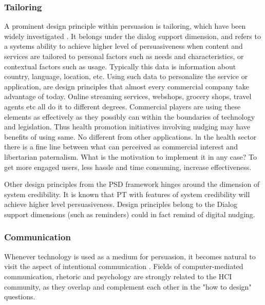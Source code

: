 \subsubsection{Tailoring}
A prominent design principle within persuasion is tailoring, which have been widely investigated \cite{torning_pdf_2009}.
It belongs under the dialog support dimension, and refers to a systems ability to achieve higher level of persuasiveness when content and services are tailored to personal factors such as needs and characteristics, or contextual factors such as usage. Typically this data is information about country, language, location, etc. Using such data to personalize the service or application, are design principles that almost every commercial company take advantage of today. Online streaming services, webshops, grocery shops, travel agents etc all do it to different degrees. Commercial players are using these elements as effectively as they possibly can within the boundaries of technology and legislation. Thus health promotion initiatives involving nudging may have benefits of using same. No different from other applications. ln the health sector there is a fine line between what can perceived as commercial interest and libertarian paternalism. What is the motivation to implement it in any case? To get more engaged users, less hassle and time consuming, increase effectiveness. %

Other design principles from the PSD framework hinges around the dimension of system credibility. It is known that PT with features of system credibility will achieve higher level persuasiveness. Design principles belong to the Dialog support dimensions (such as reminders) could in fact remind of digital nudging.
 
 \subsubsection{Communication}
Whenever technology is used as a medium for persuasion, it becomes natural to visit the aspect of intentional communication \cite{torning_pdf_2009}.
Fields of computer-mediated communication, rhetoric and psychology are strongly related to the HCI community, as they overlap and complement each other in the "how to design" questions. 

